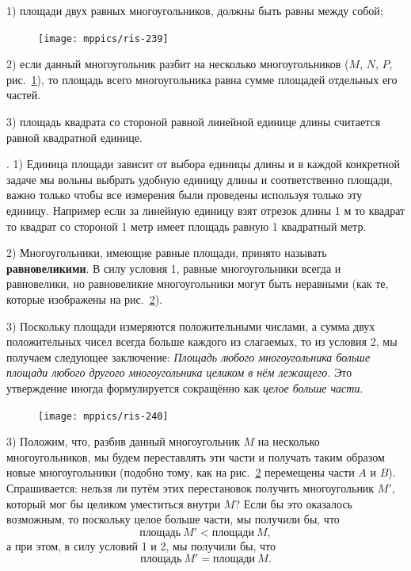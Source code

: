 \documentclass[oneside]{book}
\makeatletter
\newcommand{\rindex}[2][\imki@jobname]{%
  \index[#1]{\detokenize{#2}}%
}
\makeatother
\begin{document}
1) площади двух равных многоугольников, должны быть равны между собой; 

\begin{figure}
\centering
\texttt{[image: mppics/ris-239]}
\caption{}\label{1938/ris-239}
\end{figure}

2) если данный многоугольник разбит на несколько многоугольников ($M$, $N$, $P$, рис.~\ref{1938/ris-239}), то  площадь всего многоугольника равна сумме площадей отдельных его частей.

3) площадь квадрата со стороной равной линейной единице длины считается равной квадратной единице.


\smallskip
\mbox{.} 1) Единица площади зависит от выбора единицы длины и в каждой конкретной задаче мы вольны выбрать удобную единицу длины и соответственно площади, важно только чтобы все измерения были проведены используя только эту единицу.
Например если за линейную единицу взят отрезок длины 1 м то квадрат то квадрат со стороной 1 метр имеет площадь равную 1 квадратный метр.


2) Многоугольники, имеющие равные площади, принято называть \rindex{равновеликие многоугольники}\textbf{равновеликими}.
В силу условия 1, равные многоугольники всегда и равновелики, но равновеликие многоугольники могут быть неравными (как те, которые изображены на рис.~\ref{1938/ris-240}).

3) Поскольку площади измеряются положительными числами, а сумма двух положительных чисел всегда больше каждого из слагаемых, то из условия 2, мы получаем следующее заключение:
\emph{Площадь любого многоугольника больше площади любого другого многоугольника целиком в нём лежащего.}
Это утверждение иногда формулируется сокращённо как \emph{целое больше части}.

\begin{figure}
\centering
\texttt{[image: mppics/ris-240]}
\caption{}\label{1938/ris-240}
\end{figure}

3) Положим, что, разбив данный многоугольник $M$ на несколько многоугольников, мы будем переставлять эти части и получать таким образом новые многоугольники (подобно тому, как на рис.~\ref{1938/ris-240} перемещены части $A$ и $B$).
Спрашивается:
нельзя ли путём этих перестановок получить многоугольник $M'$, который мог бы целиком уместиться внутри $M$?
Если бы это оказалось возможным, то поскольку целое больше части, мы получили бы, что
\[\text{площадь}~M'<\text{площади}~M,\]
а при этом, в силу условий 1 и 2, мы получили бы, что
\[\text{площадь}~M'=\text{площади}~M.\]
\end{document}
